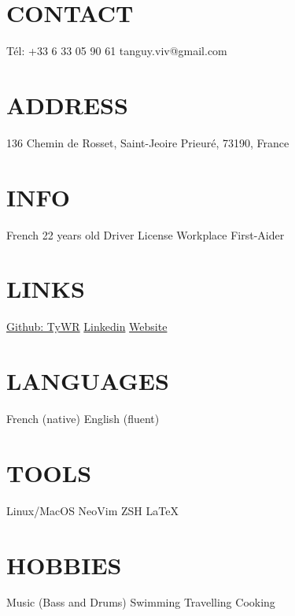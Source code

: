 \documentclass[]{cv-style}          %
\begin{document}
%
\begin{aside}
%
\section{CONTACT} \vspace{0.1cm}
Tél: +33 6 33 05 90 61
tanguy.viv@gmail.com
%
\section{ADDRESS} \vspace{0.1cm}
136 Chemin de Rosset,
Saint-Jeoire Prieuré,
73190,
France
%
\section{INFO} \vspace{0.1cm}
French
22 years old
Driver License
Workplace First-Aider
%
\section{LINKS} \vspace{0.1cm}
\href{https://github.com/TyWR}{Github: TyWR}
\href{https://www.linkedin.com/in/tanguy-vivier/}{Linkedin}
\href{https://tywr.github.io/}{Website}
%
\section{LANGUAGES} \vspace{0.1cm}
French (native)
English (fluent)
%
\section{TOOLS} \vspace{0.1cm}
Linux/MacOS
NeoVim
ZSH
\LaTeX{}
%
\section{HOBBIES} \vspace{0.1cm}
Music
(Bass and Drums)
Swimming
Travelling
Cooking
%
\end{aside}
%
%
\vspace{0.12cm}
\end{document}
